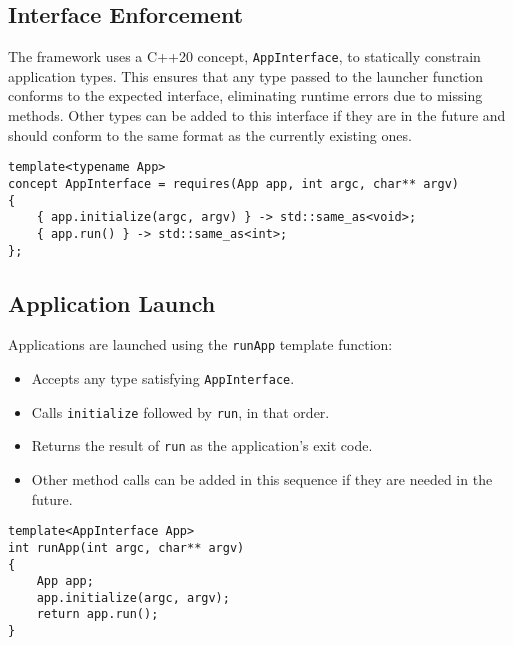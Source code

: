 \subsection*{Interface Enforcement}
The framework uses a C++20 concept, \texttt{AppInterface}, to statically constrain application types. This ensures that any type passed to the launcher function conforms to the expected interface, eliminating runtime errors due to missing methods. Other types can be added to this interface if they are in the future and should conform to the same format as the currently existing ones. 

\begin{lstlisting}[style=cppstyle]
template<typename App>
concept AppInterface = requires(App app, int argc, char** argv) 
{
    { app.initialize(argc, argv) } -> std::same_as<void>;
    { app.run() } -> std::same_as<int>;
};
\end{lstlisting}

\subsection*{Application Launch}
Applications are launched using the \texttt{runApp} template function:
\begin{itemize}
	\item Accepts any type satisfying \texttt{AppInterface}.
	\item Calls \texttt{initialize} followed by \texttt{run}, in that order.
	\item Returns the result of \texttt{run} as the application's exit code.
	\item Other method calls can be added in this sequence if they are needed in the future.
\end{itemize}
\begin{lstlisting}[style=cppstyle]
template<AppInterface App>
int runApp(int argc, char** argv)
{
    App app;
    app.initialize(argc, argv);
    return app.run();
}
\end{lstlisting}


